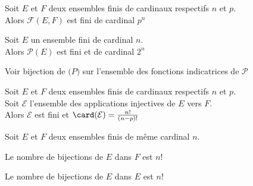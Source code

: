 \documentclass[12pt,twoside,a4paper]{article}
\author{MPSI 2}
\begin{document}
	\maketitle
	\begin{prop}
		Soit $E$ et $F$ deux ensembles finis de cardinaux respectifs $n$ et $p$.\\
		Alors $\mathcal{F}(E,F)$ est fini de cardinal $p^{n}$
	\end{prop}
	\begin{coro}
		Soit $E$ un ensemble fini de cardinal $n$.\\
		Alors $\mathcal{P}(E)$ est fini et de cardinal $2^{n}$
	\end{coro}
	\begin{preuve}
		Voir bijection de $\mathcal(P)$ sur l'ensemble des fonctions indicatrices de $\mathcal{P}$
	\end{preuve}
	\begin{prop}
		Soit $E$ et $F$ deux ensembles finis de cardinaux respectifs $n$ et $p$.\\
		Soit $\mathcal{E}$ l'ensemble des applications injectives de $E$ vers $F$.\\
		Alors $\mathcal{E}$ est fini et $\card(\mathcal{E})=\frac{n!}{(n-p)!}$
	\end{prop}
	\begin{coro}
		Soit $E$ et $F$ deux ensembles finis de m\^eme cardinal $n$.\\
		\begin{liste}
			\item Le nombre de bijections de $E$ dans $F$ est $n!$
			\item Le nombre de bijections de $E$ dans $E$ est $n!$
		\end{liste}
	\end{coro}
\end{document}
